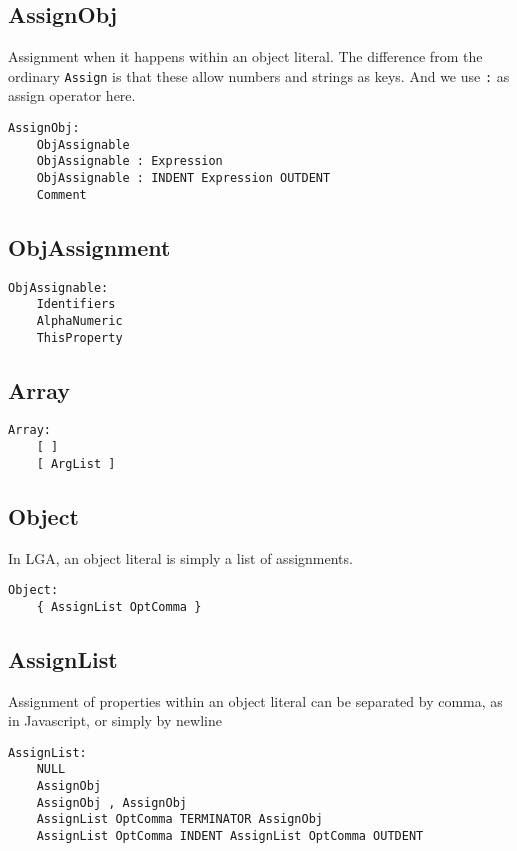 \documentclass[10pt]{report}
\begin{document}
\subsection{AssignObj}

Assignment when it happens within an object literal. The difference from the ordinary \texttt{Assign} is that these allow numbers and strings as keys. And we use \texttt{:} as assign operator here.
\begin{verbatim}
AssignObj:
    ObjAssignable
    ObjAssignable : Expression
    ObjAssignable : INDENT Expression OUTDENT
    Comment
\end{verbatim}

\subsection{ObjAssignment}
\begin{verbatim}
ObjAssignable:
    Identifiers
    AlphaNumeric
    ThisProperty
\end{verbatim}

\subsection{Array}

\begin{verbatim}
Array:
    [ ]
    [ ArgList ]
\end{verbatim}

\subsection{Object}

In LGA, an object literal is simply a list of assignments.
\begin{verbatim}
Object:
    { AssignList OptComma }
\end{verbatim}


\subsection{AssignList}

Assignment of properties within an object literal can be separated by comma, as in Javascript, or simply by newline
\begin{verbatim}
AssignList:
    NULL
    AssignObj
    AssignObj , AssignObj
    AssignList OptComma TERMINATOR AssignObj
    AssignList OptComma INDENT AssignList OptComma OUTDENT
\end{verbatim}
\end{document}
